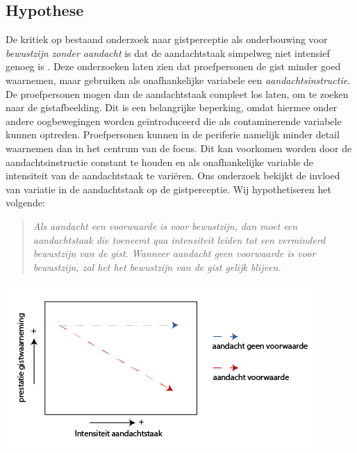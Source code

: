 \documentclass[a0,portrait]{a0poster}
\begin{document}
\begin{multicols}{3}
\color{Black} %

\section*{Hypothese}
De kritiek op bestaand onderzoek naar gistperceptie als onderbouwing voor \textit{bewustzijn zonder aandacht} is dat de aandachtstaak simpelweg niet intensief genoeg is \cite{Cohen_Alvarez_Nakayama_2011, Mack_Clarke_2012}. Deze onderzoeken laten zien dat proefpersonen de gist minder goed waarnemen, maar gebruiken als onafhankelijke variabele een \textit{aandachtsinstructie}. De proefpersonen mogen dan de aandachtstaak compleet los laten, om te zoeken naar de gistafbeelding. Dit is een belangrijke beperking, omdat hiermee onder andere oogbewegingen worden ge\"introduceerd die als contaminerende variabele kunnen optreden. Proefpersonen kunnen in de periferie namelijk minder detail waarnemen dan in het centrum van de focus\cite{moore2013clinically}. Dit kan voorkomen worden door de aandachtsinstructie constant te houden en als onafhankelijke variable de intensiteit van de aandachtstaak te vari\"eren. Ons onderzoek bekijkt de invloed van variatie in de aandachtstaak op de gistperceptie. Wij hypothetiseren het volgende:
\begin{quote}
\textit{Als aandacht een voorwaarde is voor bewustzijn, dan moet een aandachtstaak die toeneemt qua intensiteit leiden tot een verminderd bewustzijn van de gist. Wanneer aandacht geen voorwaarde is voor bewustzijn, zal het het bewustzijn van de gist gelijk blijven.}
\end{quote}
\begin{center}\vspace{1cm}
\includegraphics[width=1.0\linewidth]{illustratieHypothese.png}
\end{center}%

\end{multicols}
\end{document}

